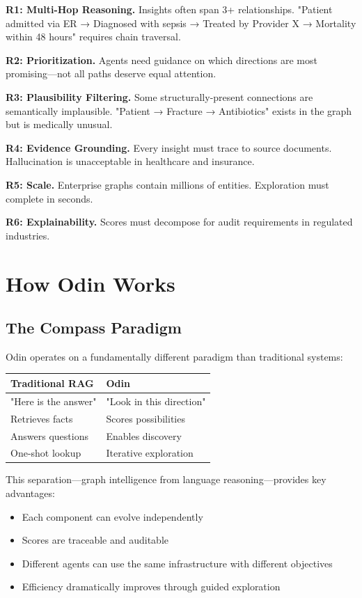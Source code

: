 \documentclass[11pt]{article}
\begin{document}
\textbf{R1: Multi-Hop Reasoning.} Insights often span 3+ relationships. "Patient admitted via ER → Diagnosed with sepsis → Treated by Provider X → Mortality within 48 hours" requires chain traversal.

\textbf{R2: Prioritization.} Agents need guidance on which directions are most promising—not all paths deserve equal attention.

\textbf{R3: Plausibility Filtering.} Some structurally-present connections are semantically implausible. "Patient → Fracture → Antibiotics" exists in the graph but is medically unusual.

\textbf{R4: Evidence Grounding.} Every insight must trace to source documents. Hallucination is unacceptable in healthcare and insurance.

\textbf{R5: Scale.} Enterprise graphs contain millions of entities. Exploration must complete in seconds.

\textbf{R6: Explainability.} Scores must decompose for audit requirements in regulated industries.

\section{How Odin Works}

\subsection{The Compass Paradigm}

Odin operates on a fundamentally different paradigm than traditional systems:

\begin{center}
\begin{tabular}{@{}ll@{}}
\toprule
\textbf{Traditional RAG} & \textbf{Odin} \\ \midrule
"Here is the answer" & "Look in this direction" \\
Retrieves facts & Scores possibilities \\
Answers questions & Enables discovery \\
One-shot lookup & Iterative exploration \\ \bottomrule
\end{tabular}
\end{center}

This separation—graph intelligence from language reasoning—provides key advantages:
\begin{itemize}
\item Each component can evolve independently
\item Scores are traceable and auditable
\item Different agents can use the same infrastructure with different objectives
\item Efficiency dramatically improves through guided exploration
\end{itemize}
\end{document}

